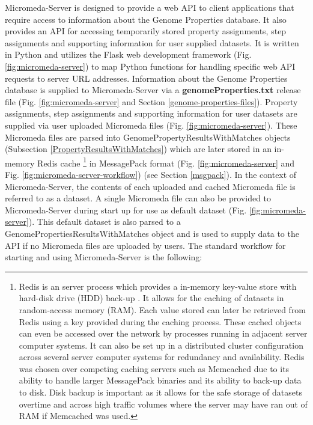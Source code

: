 Micromeda-Server is designed to provide a web API to client applications that require access to information about the Genome Properties database. It also provides an API for accessing temporarily stored property assignments, step assignments and supporting information for user supplied datasets. It is written in Python and utilizes the Flask web development framework \cite{grinberg2018flask} (Fig. \ref{fig:micromeda-server}) to map Python functions for handling specific web API requests to server URL addresses. Information about the Genome Properties database is supplied to Micromeda-Server via a \textbf{genomeProperties.txt} release file (Fig. \ref{fig:micromeda-server} and Section \ref{genome-properties-files}). Property assignments, step assignments and supporting information for user datasets are supplied via user uploaded Micromeda files (Fig. \ref{fig:micromeda-server}). These Micromeda files are parsed into GenomePropertyResultsWithMatches objects (Subsection \ref{PropertyResultsWithMatches}) which are later stored in an in-memory Redis cache \footnote{Redis is an server process which provides a in-memory key-value store with hard-disk drive (HDD) back-up  \cite{han2011survey}. It allows for the caching of datasets in random-access memory (RAM). Each value stored can later be retrieved from Redis using a key provided during the caching process. These cached objects can even be accessed over the network by processes running in adjacent server computer systems. It can also be set up in a distributed cluster configuration across several server computer systems for redundancy and availability. Redis was chosen over competing caching servers such as Memcached \cite{fitzpatrick2004distributed} due to its ability to handle larger MessagePack binaries \cite{furuhashi2013messagepack} and its ability to back-up data to disk. Disk backup is important as it allows for the safe storage of datasets overtime and across high traffic volumes where the server may have ran out of RAM if Memcached was used.} in MessagePack format \cite{furuhashi2013messagepack} (Fig. \ref{fig:micromeda-server} and Fig. \ref{fig:micromeda-server-workflow}) (see Section \ref{msgpack}). In the context of Micromeda-Server, the contents of each uploaded and cached Micromeda file is referred to as a dataset. A single Micromeda file can also be provided to Micromeda-Server during start up for use as default dataset (Fig. \ref{fig:micromeda-server}). This default dataset is also parsed to a GenomePropertiesResultsWithMatches object and is used to supply data to the API if no Micromeda files are uploaded by users. The standard workflow for starting and using Micromeda-Server is the following:


